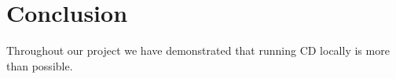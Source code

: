\chapter{Conclusion}
\label{chap:conclusion}

Throughout our project we have demonstrated that running CD locally is more than possible.


